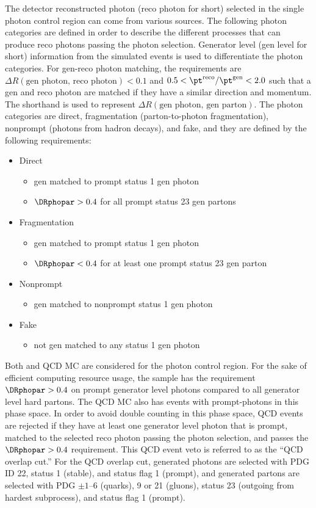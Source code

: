The detector reconstructed photon (reco photon for short) selected in the single photon control region can come from various sources.
The following photon categories are defined in order to describe the different processes that can produce reco photons passing the photon selection.
Generator level (gen level for short) information from the simulated events is used to differentiate the photon categories.
For gen-reco photon matching, the requirements are $\Delta R \left(\text{gen photon, reco photon}\right) < 0.1$ and $0.5 < \pt^\text{reco} / \pt^\text{gen} < 2.0$ such that a gen and reco photon are matched if they have a similar direction and momentum.
The shorthand \DRphopar is used to represent $\Delta R\left(\text{gen photon, gen parton}\right)$.
The photon categories are direct, fragmentation (parton-to-photon fragmentation), nonprompt (photons from hadron decays), and fake, and they are defined by the following requirements:
\begin{itemize} %
\item Direct
\begin{itemize}
\item gen matched to prompt status 1 gen photon
\item $\DRphopar > 0.4$ for all prompt status 23 gen partons
\end{itemize}
\item Fragmentation
\begin{itemize}
\item gen matched to prompt status 1 gen photon
\item $\DRphopar < 0.4$ for at least one prompt status 23 gen parton
\end{itemize}
\item Nonprompt
\begin{itemize}
\item gen matched to nonprompt status 1 gen photon
\end{itemize}
\item Fake
\begin{itemize}
\item not gen matched to any status 1 gen photon
\end{itemize}
\end{itemize}

Both \gjets and QCD MC are considered for the photon control region.
For the sake of efficient computing resource usage, the \MADGRAPH \gjets sample has the requirement $\DRphopar > 0.4$ on prompt generator level photons compared to all generator level hard partons.
The QCD MC also has events with prompt-photons in this phase space.
In order to avoid double counting in this phase space, QCD events are rejected if they have at least one generator level photon that is prompt, matched to the selected reco photon passing the photon selection, and passes the $\DRphopar > 0.4$ requirement.
This QCD event veto is referred to as the ``QCD overlap cut.''
For the QCD overlap cut, generated photons are selected with PDG ID 22, \PYTHIA status 1 (stable), and status flag 1 (prompt), and generated partons are selected with PDG $\pm\text{1--6}$ (quarks), 9 or 21 (gluons), \PYTHIA status 23 (outgoing from hardest subprocess), and status flag 1 (prompt).

